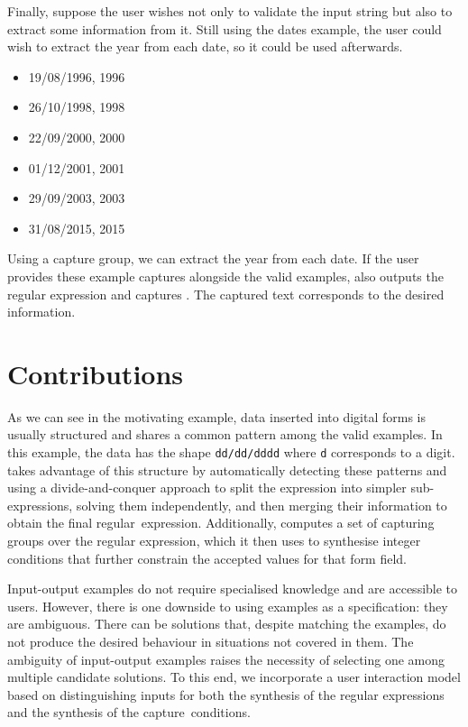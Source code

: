 Finally, suppose the user wishes not only to validate the input string but also to extract some information from it. Still using the dates example, the user could wish to extract the year from each date, so it could be used afterwards.
\begin{multicols}{3}
    \begin{itemize}[label={}]
    \item 19/08/1996, 1996
    \item 26/10/1998, 1998
    \item 22/09/2000, 2000
    \item 01/12/2001, 2001
    \item 29/09/2003, 2003
    \item 31/08/2015, 2015
    \end{itemize}
\end{multicols}

Using a capture group, we can extract the year from each date. If the user provides these example captures alongside the valid examples, \Forest also outputs the regular expression and captures . The captured text corresponds to the desired information.

\section{Contributions}

As we can see in the motivating example, data inserted into digital forms is usually structured and shares a common pattern among the valid examples.
In this example, the data has the shape \texttt{dd/dd/dddd} where \texttt{d} corresponds to a digit. 
\Forest takes advantage of this structure by automatically detecting these patterns and using a divide-and-conquer approach to split the expression into simpler sub-expressions, solving them independently, and then merging their information to obtain the final regular~expression.
Additionally, \Forest computes a set of capturing groups over the regular expression, which it then uses to synthesise integer conditions that further constrain the accepted values for that form field.

Input-output examples do not require specialised knowledge and are accessible to users.
However, there is one downside to using examples as a specification: they are ambiguous. There can be solutions that, despite matching the examples, do not produce the desired behaviour in situations not covered in them.
The ambiguity of input-output examples raises the necessity of selecting one among multiple candidate solutions.
%
To this end, we incorporate a user interaction model based on distinguishing inputs
for both the synthesis of the regular expressions and the synthesis of the capture~conditions. 

